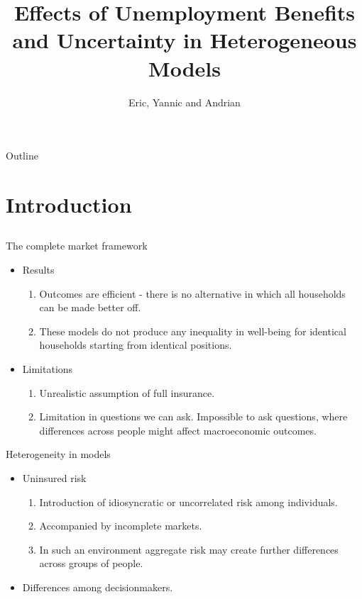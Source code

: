 \documentclass{beamer}
\title{Effects of Unemployment Benefits and Uncertainty in Heterogeneous Models}
\subtitle{}
\author{Eric, Yannic and Andrian}
\begin{document}
\begin{frame}
  \titlepage
\end{frame}

\begin{frame}{Outline}
  \tableofcontents
\end{frame}

\section{Introduction}
\subsection{}
\begin{frame}{The complete market framework}
  \begin{itemize}

  \item {
  Results
  }
	\begin{enumerate}
		\item{
		Outcomes are efficient - there is no alternative in which all households can be made better off.
		}
		\item{
		These models do not produce any inequality in well-being for identical households starting from identical positions. 
		}
	\end{enumerate}
		
  \item {
  Limitations  
  }
	\begin{enumerate}
		\item{
Unrealistic assumption of full insurance.
		}
		\item{
Limitation in questions we can ask. Impossible to ask questions, where differences across people might affect macroeconomic outcomes.
		}
	\end{enumerate}

  \end{itemize}

\end{frame}

\begin{frame}{Heterogeneity in models}
  \begin{itemize}

  \item {
  Uninsured risk
  }
	\begin{enumerate}
		\item{
Introduction of idiosyncratic or uncorrelated risk among individuals.
		}
		\item{
Accompanied by incomplete markets.
		}
		\item{
In such an environment aggregate risk may create further differences across groups of people.
		}
	\end{enumerate}
		
\item{
Differences among decisionmakers.
}

  \end{itemize}
\end{frame}
\end{document}
